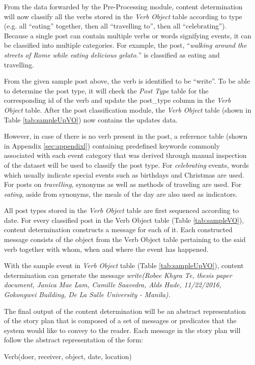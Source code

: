 From the data forwarded by the Pre-Processing module, content determination will now classify all the verbs stored in the \textit{Verb Object} table according to type (e.g. all ``eating” together, then all ``travelling to”, then all ``celebrating”). Because a single post can contain multiple verbs or words signifying events, it can be classified into multiple categories. For example, the post, ``\textit{walking around the streets of Rome while eating delicious gelato.}” is classified as eating and travelling.

From the given sample post above, the verb is identified to be ``write”. To be able to determine the post type, it will check the \textit{Post Type} table for the corresponding id of the verb and update the post\_type column in the \textit{Verb Object} table. After the post classification module, the \textit{Verb Object} table (shown in Table  \ref{tab:sampleUpVO}) now contains the updates data.

However, in case of there is no verb present in the post, a reference table (shown in Appendix \ref{sec:appendixl}) containing predefined keywords commonly associated with each event category that was derived through manual inspection of the dataset will be used to classify the post type. For \textit{celebrating} events, words which usually indicate special events such as birthdays and Christmas are used. For posts on \textit{travelling}, synonyms as well as methods of traveling are used. For \textit{eating}, aside from synonyms, the meals of the day are also used as indicators.

All post types stored in the \textit{Verb Object} table are first sequenced according to date. For every classified post in the Verb Object table (Table \ref{tab:sampleVO}), content determination constructs a message for each of it. Each constructed message consists of the object from the Verb Object table pertaining to the said verb together with whom, when and where the event has happened.

With the sample event in \textit{Verb Object} table (Table \ref{tab:sampleUpVO}), content determination can generate the message \textit{write(Robee Khyra Te, thesis paper document, Janica Mae Lam, Camille Saavedra, Alds Hade, 11/22/2016, Gokongwei Building, De La Salle University - Manila).} 

The final output of the content determination will be an abstract representation of the story plan that is composed of a set of messages or predicates that the system would like to convey to the reader. Each message in the story plan will follow the abstract representation of the form:
\begin{center}Verb(doer, receiver, object, date, location) \end{center}

